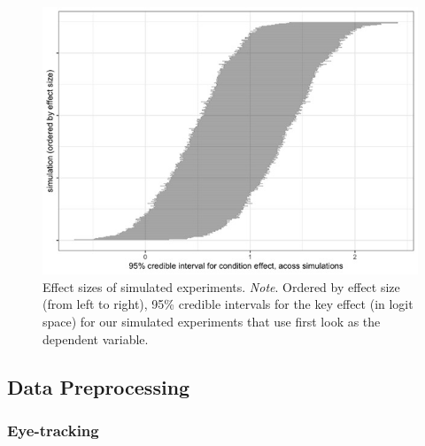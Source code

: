 \documentclass[
  english,
  man,floatsintext]{apa6}
\begin{document}
\begin{figure}

\includegraphics[width=6in]{Figure3} \hfill{}

\caption{Effect sizes of simulated experiments. \newline{} \textit{Note}. Ordered by effect size (from left to right), 95\% credible intervals for the key effect (in logit space) for our simulated experiments that use first look as the dependent variable.}\label{fig:fig3}
\end{figure}

\hypertarget{data-preprocessing}{%
\subsection{Data Preprocessing}\label{data-preprocessing}}

\hypertarget{eye-tracking}{%
\subsubsection{Eye-tracking}\label{eye-tracking}}
\end{document}
